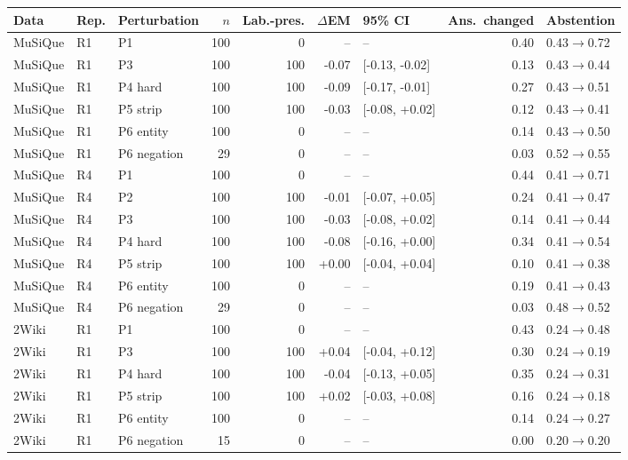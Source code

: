\begin{table}[t]
\centering
\footnotesize
\begin{adjustbox}{max width=\linewidth}
\begin{tabular}{@{}lllrrrlrl@{}}
\toprule
Data & Rep. & Perturbation & $n$ & Lab.-pres. & $\Delta$EM & 95\% CI & Ans.\ changed & Abstention \\
\midrule
MuSiQue & R1 & P1 & 100 & 0 & -- & -- & 0.40 & 0.43$\to$0.72 \\
MuSiQue & R1 & P3 & 100 & 100 & -0.07 & [-0.13, -0.02] & 0.13 & 0.43$\to$0.44 \\
MuSiQue & R1 & P4 hard & 100 & 100 & -0.09 & [-0.17, -0.01] & 0.27 & 0.43$\to$0.51 \\
MuSiQue & R1 & P5 strip & 100 & 100 & -0.03 & [-0.08, +0.02] & 0.12 & 0.43$\to$0.41 \\
MuSiQue & R1 & P6 entity & 100 & 0 & -- & -- & 0.14 & 0.43$\to$0.50 \\
MuSiQue & R1 & P6 negation & 29 & 0 & -- & -- & 0.03 & 0.52$\to$0.55 \\
\midrule
MuSiQue & R4 & P1 & 100 & 0 & -- & -- & 0.44 & 0.41$\to$0.71 \\
MuSiQue & R4 & P2 & 100 & 100 & -0.01 & [-0.07, +0.05] & 0.24 & 0.41$\to$0.47 \\
MuSiQue & R4 & P3 & 100 & 100 & -0.03 & [-0.08, +0.02] & 0.14 & 0.41$\to$0.44 \\
MuSiQue & R4 & P4 hard & 100 & 100 & -0.08 & [-0.16, +0.00] & 0.34 & 0.41$\to$0.54 \\
MuSiQue & R4 & P5 strip & 100 & 100 & +0.00 & [-0.04, +0.04] & 0.10 & 0.41$\to$0.38 \\
MuSiQue & R4 & P6 entity & 100 & 0 & -- & -- & 0.19 & 0.41$\to$0.43 \\
MuSiQue & R4 & P6 negation & 29 & 0 & -- & -- & 0.03 & 0.48$\to$0.52 \\
\midrule
2Wiki & R1 & P1 & 100 & 0 & -- & -- & 0.43 & 0.24$\to$0.48 \\
2Wiki & R1 & P3 & 100 & 100 & +0.04 & [-0.04, +0.12] & 0.30 & 0.24$\to$0.19 \\
2Wiki & R1 & P4 hard & 100 & 100 & -0.04 & [-0.13, +0.05] & 0.35 & 0.24$\to$0.31 \\
2Wiki & R1 & P5 strip & 100 & 100 & +0.02 & [-0.03, +0.08] & 0.16 & 0.24$\to$0.18 \\
2Wiki & R1 & P6 entity & 100 & 0 & -- & -- & 0.14 & 0.24$\to$0.27 \\
2Wiki & R1 & P6 negation & 15 & 0 & -- & -- & 0.00 & 0.20$\to$0.20 \\

\end{tabular}
\end{adjustbox}
\end{table}
